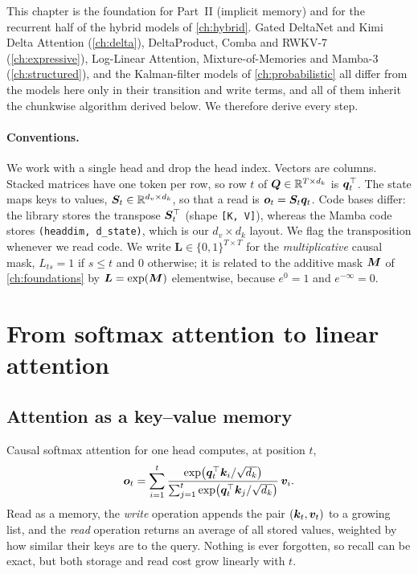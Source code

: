 This chapter is the foundation for Part~II (implicit memory) and for the recurrent half of the
hybrid models of \cref{ch:hybrid}. Gated DeltaNet and Kimi Delta Attention (\cref{ch:delta}),
DeltaProduct, Comba and RWKV-7 (\cref{ch:expressive}), Log-Linear Attention, Mixture-of-Memories
and Mamba-3 (\cref{ch:structured}), and the Kalman-filter models of \cref{ch:probabilistic} all
differ from the models here only in their transition and write terms, and all of them inherit
the chunkwise algorithm derived below. We therefore derive every step.

\paragraph{Conventions.}
We work with a single head and drop the head index. Vectors are columns. Stacked matrices have
one token per row, so row $t$ of $\bm{Q}\in\mathbb{R}^{T\times d_k}$ is $\bm{q}_t^{\top}$. The state maps keys to
values, $\bm{S}_t\in\mathbb{R}^{d_v\times d_k}$, so that a read is $\bm{o}_t=\bm{S}_t\bm{q}_t$. Code bases differ:
the \fla{} library stores the transpose $\bm{S}_t^{\top}$ (shape \texttt{[K, V]}), whereas the Mamba
code stores \texttt{(headdim, d\_state)}, which is our $d_v\times d_k$ layout. We flag the
transposition whenever we read code. We write $\bm{L}\in\{0,1\}^{T\times T}$ for the
\emph{multiplicative} causal mask, $L_{ts}=1$ if $s\le t$ and $0$ otherwise; it is related to
the additive mask $\bm{M}$ of \cref{ch:foundations} by $\bm{L}=\exp(\bm{M})$ elementwise, because
$e^0=1$ and $e^{-\infty}=0$.

\section{From softmax attention to linear attention}\label{sec:c03-linear}

\subsection{Attention as a key--value memory}

Causal softmax attention for one head computes, at position $t$,
\begin{equation}\label{eq:c03-softmax}
  \bm{o}_t=\sum_{i=1}^{t}
  \frac{\exp\!\big(\bm{q}_t^{\top}\bm{k}_i/\sqrt{d_k}\big)}{\sum_{j=1}^{t}\exp\!\big(\bm{q}_t^{\top}\bm{k}_j/\sqrt{d_k}\big)}\,\bm{v}_i .
\end{equation}
Read as a memory, the \emph{write} operation appends the pair $(\bm{k}_t,\bm{v}_t)$ to a growing list,
and the \emph{read} operation returns an average of all stored values, weighted by how similar
their keys are to the query. Nothing is ever forgotten, so recall can be exact, but both storage
and read cost grow linearly with $t$.

